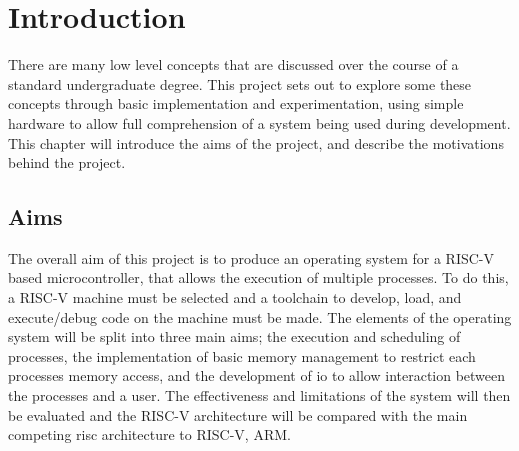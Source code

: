 \chapter{Introduction}
\label{cha:intro}
There are many low level concepts that are discussed over the course of a standard undergraduate degree. This project sets out to explore some these concepts through basic implementation and experimentation, using simple hardware to allow full comprehension of a system being used during development. This chapter will introduce the aims of the project, and describe the motivations behind the project.
\section{Aims}
The overall aim of this project is to produce an operating system for a RISC-V based microcontroller, that allows the execution of multiple processes. To do this, a RISC-V machine must be selected and a toolchain to develop, load, and execute/debug code on the machine must be made. The elements of the operating system will be split into three main aims; the execution and scheduling of processes, the implementation of basic memory management to restrict each processes memory access, and the development of \ac{io} to allow interaction between the processes and a user. The effectiveness and limitations of the system will then be evaluated and the RISC-V architecture will be compared with the main competing \ac{risc} architecture to RISC-V, ARM. 


